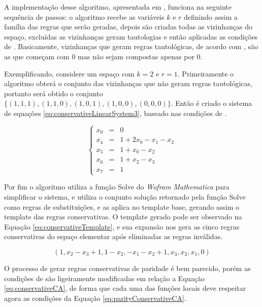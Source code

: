 \documentclass[12pt,a4paper]{article}
\begin{document}
	A implementação desse algoritmo, apresentada em \cite{deOliveira2014}, funciona na seguinte sequência de passos: o algoritmo recebe as variáveis $k$ e $r$ definindo assim a família das regras que serão geradas, depois são criadas todas as vizinhanças do espaço, excluídas as vizinhanças geram tautologias e então aplicadas as condições de . Basicamente, vizinhanças que geram regras tautológicas, de acordo com \cite{Schranko2010}, são as que começam com 0 mas não sejam compostas apenas por 0.

	Exemplificando, considere um espaço com $k=2$ e $r=1$. Primeiramente o algoritmo obterá o conjunto das vizinhanças que não geram regras tautológicas, portanto será obtido o conjunto $\{(1,1,1),(1,1,0),(1,0,1),(1,0,0),(0,0,0)\}$. Então é criado o sistema de equações \ref{eq:conservativeLinearSystem3}, baseado nas condições de .

	\begin{equation}
	\left\{\begin{matrix}
	 x_0 & = & 0\\ 
	 x_4 & = & 1 +2x_0 -x_1 -x_2\\ 
	 x_5 & = & 1 +x_0 -x_2\\
	 x_6 & = & 1 +x_2 -x_3\\ 
	 x_7 & = & 1
	\end{matrix}\right.
	\label{eq:conservativeLinearSystem3}
	\end{equation}

	Por fim o algoritmo utiliza a função Solve do \textit{Wofram Mathematica} para simplificar o sistema, e utiliza o conjunto solução retornado pela função Solve como regras de substituições, e as aplica no template base, gerando assim o template das regras conservativas. O template gerado pode ser observado na Equação \ref{eq:conservativeTemplate}, e sua expansão nos gera as cinco regras conservativas do espaço elementar após eliminadas as regras inválidas.

	\begin{equation}
	(1,x_2-x_3+1,1-x_2,-x_1-x_2+1,x_3,x_2,x_1,0)
	\label{eq:conservativeTemplate}
	\end{equation}

	O processo de gerar regras conservativas de paridade é bem parecido, porém as condições de  são ligeiramente modificadas em relação a Equação \ref{eq:conservativeCA}, de forma que cada uma das funções locais deve respeitar agora as condições da Equação \ref{eq:parityConservativeCA}.
\end{document}
